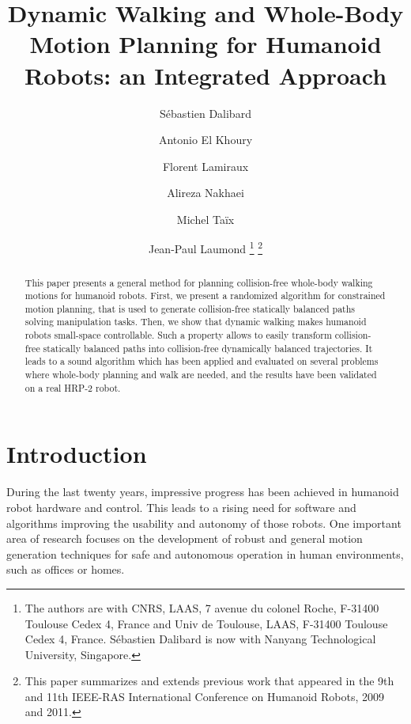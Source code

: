 \documentclass{article}
\begin{document}
\title{Dynamic Walking and Whole-Body Motion Planning for Humanoid Robots: an Integrated Approach}

\author{
  S\'ebastien Dalibard\and
  Antonio El Khoury\and
  Florent Lamiraux\and
  Alireza Nakhaei\and
  Michel Ta\"ix\and
  Jean-Paul Laumond
  \footnote{The authors are with CNRS, LAAS, 7 avenue du colonel
    Roche, F-31400 Toulouse Cedex 4, France and Univ de Toulouse,
    LAAS, F-31400 Toulouse Cedex 4, France. S\'ebastien Dalibard is
    now with Nanyang Technological University, Singapore.}
  \footnote{
    This paper summarizes and extends previous work that appeared in the 9th and 11th
    IEEE-RAS International Conference on Humanoid Robots, 2009 and 2011.
  }
}

\date{}

\maketitle

\begin{abstract}

This paper presents a general method for planning collision-free whole-body walking motions
for humanoid robots. First, we present a randomized algorithm for constrained motion
planning, that is used to generate collision-free statically balanced paths solving
manipulation tasks. Then, we show that dynamic walking makes humanoid robots 
small-space controllable. Such a property allows to easily transform 
collision-free statically balanced paths into 
collision-free dynamically balanced trajectories. It leads to a sound 
algorithm which has been applied and evaluated on several
problems where whole-body planning and  walk are needed,
and the results have been validated  on a real HRP-2 robot.

\end{abstract}

\section{Introduction}

During the last twenty years, impressive progress has been achieved in humanoid
robot hardware and control. This leads to a rising need for software and algorithms
improving the usability and autonomy of those robots. One important area of research
focuses on the development of robust and general motion generation techniques for safe
and autonomous operation in human environments, such as offices or homes.
\end{document}
